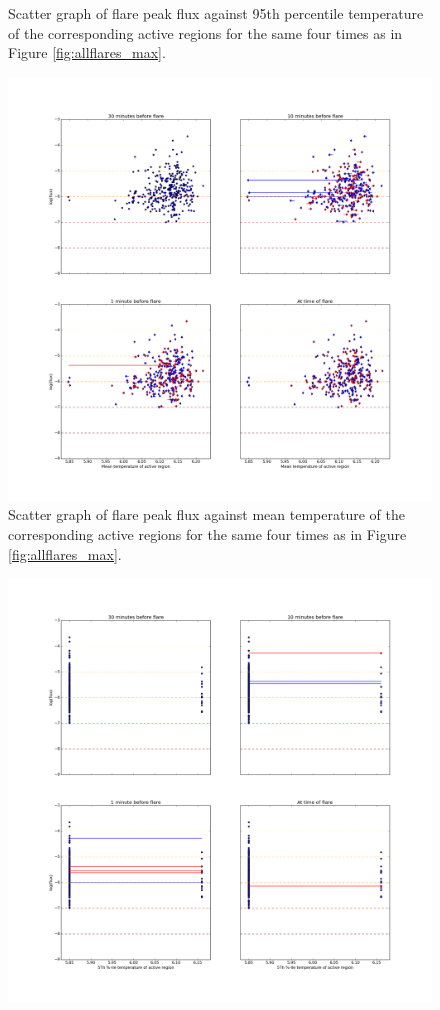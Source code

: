 \documentclass[referee,a4paper,12pt]{swsc}
\begin{document}
\begin{linenumbers}
\begin{figure}
	\caption{Scatter graph of flare peak flux against 95th percentile temperature of the corresponding active regions for the same four times as in Figure \ref{fig:allflares_max}.}
	\label{fig:allflares_p95}
\end{figure}
\begin{figure}
	\centering
		\includegraphics[width=0.9\columnwidth]{tempplotsmean/allflares.png}
	\caption{Scatter graph of flare peak flux against mean temperature of the corresponding active regions for the same four times as in Figure \ref{fig:allflares_max}.}
	\label{fig:allflares_mean}
\end{figure}
\begin{figure}
	\centering
		\includegraphics[width=0.9\columnwidth]{tempplots_p5/allflares.png}

\end{figure}
\end{linenumbers}
\end{document}
